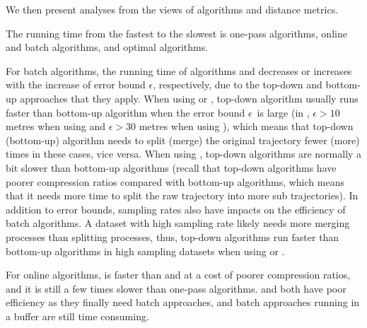 


We then present analyses from the views of \lsa algorithms and distance metrics.


The running time from the fastest to the slowest is one-pass algorithms, online and batch algorithms, and optimal algorithms.

For batch algorithms, the running time of algorithms \dpa and \tpa decreases or increases with the increase of error bound $\epsilon$, respectively, due to the top-down and bottom-up approaches that they apply. When using \ped or \sed, top-down algorithm usually runs faster than bottom-up algorithm when the error bound $\epsilon$~is large (\eg in \geolife, $\epsilon >10$ metres when using \ped and $\epsilon >30$ metres when using \sed), which means that top-down (bottom-up) algorithm needs to split (merge) the original trajectory fewer (more) times in these cases, vice versa. When using \dad,  top-down algorithms are normally a bit slower than bottom-up algorithms (recall that top-down algorithms have poorer compression ratios compared with bottom-up algorithms, which means that it needs more time to split the raw trajectory into more sub trajectories).
In addition to error bounds, sampling rates also have impacts on the efficiency of batch algorithms. A dataset with high sampling rate likely needs more merging processes than splitting processes, thus, top-down algorithms run faster than bottom-up algorithms in high sampling datasets when using \ped or \sed.

For online algorithms, \squishe is faster than \bqsa and \opwa at a cost of poorer compression ratios, and it is still a few times slower than one-pass algorithms. \bqsa and \opwa both have poor efficiency as they finally need batch approaches, and batch approaches running in a buffer are still time consuming.

